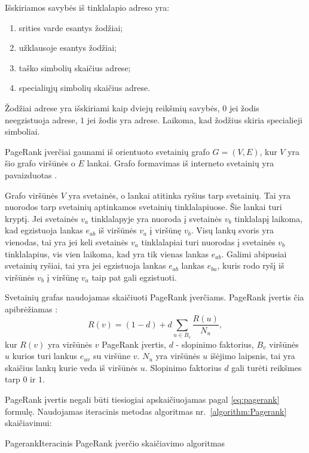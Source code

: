 Išskiriamos savybės iš tinklalapio adreso yra:
\begin{enumerate}
\item srities varde esantys žodžiai;
\item užklausoje esantys žodžiai;
\item taško simbolių skaičius adrese;
\item specialiųjų simbolių skaičius adrese.
\end{enumerate}
Žodžiai adrese yra išskiriami kaip dviejų reikšmių savybės, $0$ jei žodis neegzistuoja adrese, $1$ jei žodis yra adrese. Laikoma, kad žodžius skiria specialieji simboliai.

PageRank įverčiai gaunami iš orientuoto svetainių grafo $G = (V, E)$, kur $V$ yra šio grafo viršūnės o $E$ lankai. Grafo formavimas iš interneto svetainių yra pavaizduotas  .

Grafo viršūnės $V$ yra svetainės, o lankai atitinka ryšius tarp svetainių. Tai yra nuorodos tarp svetainių aptinkamos svetainių tinklalapiuose. Šie lankai turi kryptį. Jei svetainės $v_a$ tinklalapyje yra nuoroda į svetainės $v_b$ tinklalapį laikoma, kad egzistuoja lankas $e_{ab}$ iš viršūnės $v_a$ į viršūnę $v_b$. Visų lankų svoris yra vienodas, tai yra jei keli svetainės $v_a$ tinklalapiai turi nuorodas į svetainės $v_b$ tinklalapius, vis vien laikoma, kad yra tik vienas lankas $e_{ab}$. Galimi abipusiai svetainių ryšiai, tai yra jei egzistuoja lankas $e_{ab}$ lankas $e_{ba}$, kuris rodo ryšį iš viršūnės $v_b$ į viršūnę $v_a$ taip pat gali egzistuoti.

Svetainių grafas naudojamas skaičiuoti PageRank įverčiams. PageRank įvertis čia apibrėžiamas \cite{pagerank}:
\begin{equation} \label{eq:pagerank}
    R(v) = (1 - d) + d \sum_{u \in B_{v}} \frac{R(u)}{N_u},
\end{equation}
kur $R(v)$ yra viršūnės $v$ PageRank įvertis, $d$ - slopinimo faktorius, $B_v$ viršūnės $u$ kurios turi lankus $e_{uv}$ su viršūne $v$. $N_u$ yra viršūnės $u$ išėjimo laipsnis, tai yra skaičius lankų kurie veda iš viršūnės $u$. Slopinimo faktorius $d$ gali turėti reikšmes tarp $0$ ir $1$.

PageRank įvertis negali būti tiesiogiai apskaičiuojamas pagal \ref{eq:pagerank} formulę. Naudojamas iteracinis metodas algoritmas  nr.~\vref{algorithm:Pagerank} skaičiavimui:

\begin{ktualgo}{Pagerank}{Iteracinis PageRank įverčio skaičiavimo algoritmas}
\Repeat
{}
\EndFor{}
\EndFor{}
\end{ktualgo}

